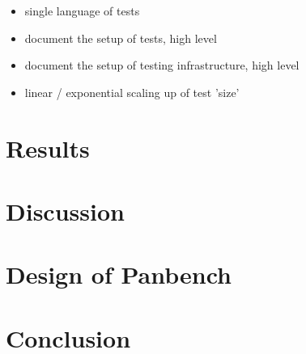 \documentclass[a4paper,UKenglish,cleveref, autoref, thm-restate,anonymous]{lipics-v2021}
\newcommand{\panbench}{Panbench}
\begin{document}
\begin{itemize}
\item single language of tests
\item document the setup of tests, high level
\item document the setup of testing infrastructure, high level
\item linear / exponential scaling up of test 'size'
\end{itemize}

\section{Results}
\label{sec:results}

\section{Discussion}
\label{sec:discuss}

\section{Design of \panbench}
\label{sec:design}

\section{Conclusion}
\label{sec:conc}




\end{document}

